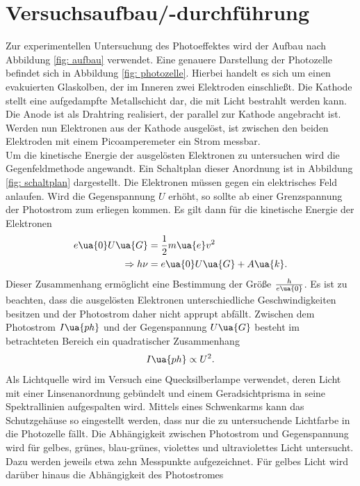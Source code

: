 \section{Versuchsaufbau/-durchführung}
Zur experimentellen Untersuchung des Photoeffektes wird der Aufbau nach Abbildung \ref{fig: aufbau} verwendet. Eine
genauere Darstellung der Photozelle befindet sich in Abbildung \ref{fig: photozelle}. Hierbei handelt es sich um einen
evakuierten Glaskolben, der im Inneren zwei Elektroden einschließt. Die Kathode stellt eine aufgedampfte
Metallschicht dar, die mit Licht bestrahlt werden kann. Die Anode ist als Drahtring realisiert, der parallel
zur Kathode angebracht ist. Werden nun Elektronen aus der Kathode ausgelöst, ist zwischen den beiden Elektroden
mit einem Picoamperemeter ein Strom messbar. \\
Um die kinetische Energie der ausgelösten Elektronen zu untersuchen wird die Gegenfeldmethode angewandt. Ein Schaltplan
dieser Anordnung ist in Abbildung \ref{fig: schaltplan} dargestellt. Die Elektronen müssen gegen ein elektrisches Feld anlaufen.
Wird die Gegenspannung $U$ erhöht, so sollte ab einer Grenzspannung der Photostrom zum erliegen kommen. Es gilt dann
für die kinetische Energie der Elektronen
\begin{align}
  \label{eq:regress}
\begin{aligned}
  e\ua{0} U\ua{G} &= \frac{1}{2}m\ua{e}v^2 \\
  \Rightarrow h\nu &= e\ua{0}U\ua{G} + A\ua{k}.
\end{aligned}
\end{align}
Dieser Zusammenhang ermöglicht eine Bestimmung der Größe $\frac{h}{e\ua{0}}$. Es ist zu beachten, dass
die ausgelösten Elektronen unterschiedliche Geschwindigkeiten besitzen und der Photostrom daher nicht apprupt
abfällt. Zwischen dem Photostrom $I\ua{ph}$ und der Gegenspannung $U\ua{G}$ besteht im betrachteten Bereich ein quadratischer Zusammenhang
\begin{equation}
  I\ua{ph} \propto U^2.
\end{equation}
Als Lichtquelle wird im Versuch eine Quecksilberlampe verwendet, deren Licht mit einer Linsenanordnung gebündelt
und einem Geradsichtprisma in seine Spektrallinien aufgespalten wird. Mittels eines Schwenkarms kann das Schutzgehäuse
so eingestellt werden, dass nur die zu untersuchende Lichtfarbe in die Photozelle fällt. Die Abhängigkeit zwischen
Photostrom und Gegenspannung wird für gelbes, grünes, blau-grünes, violettes und ultraviolettes Licht untersucht. Dazu
werden jeweils etwa zehn Messpunkte aufgezeichnet. Für gelbes Licht wird darüber hinaus die Abhängigkeit des Photostromes
